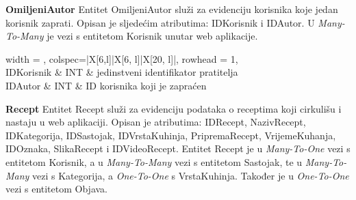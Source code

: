 \vspace{\baselineskip}
\textnormal{\textbf{OmiljeniAutor}		Entitet OmiljeniAutor služi za evidenciju korisnika koje jedan korisnik zaprati. Opisan je sljedećim atributima: IDKorisnik i IDAutor. U \textit{Many-To-Many} je vezi s entitetom Korisnik unutar web aplikacije.}

\begin{longtblr}[
	label=none,
	entry=none
	]{
	width = \textwidth,
	colspec={|X[6,l]|X[6, l]|X[20, l]|},
	rowhead = 1,
	} %
	\hline {}                             \\ \hline[3pt]
	IDKorisnik & INT & jedinstveni identifikator pratitelja \\ \hline
	IDAutor     & INT & ID korisnika koji je zapraćen        \\ \hline
\end{longtblr}

\vspace{\baselineskip}
\textnormal{\textbf{Recept}		Entitet Recept služi za evidenciju podataka o receptima koji cirkulišu i nastaju u web aplikaciji. Opisan je atributima: IDRecept, NazivRecept, IDKategorija, IDSastojak, IDVrstaKuhinja, PripremaRecept, VrijemeKuhanja, IDOznaka, SlikaRecept i IDVideoRecept. Entitet Recept je u \textit{Many-To-One} vezi s entitetom Korisnik, a u \textit{Many-To-Many} vezi s entitetom Sastojak, te u \textit{Many-To-Many} vezi s Kategorija, a \textit{One-To-One} s VrstaKuhinja. Također je u \textit{One-To-One} vezi s entitetom Objava.}

